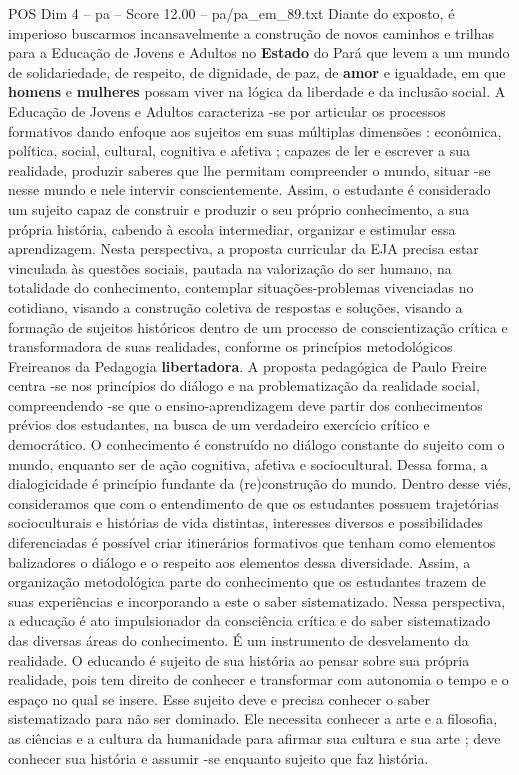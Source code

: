\begin{textsample}{POS Dim 4 – pa – Score 12.00 – pa/pa\_em\_89.txt}
Diante do exposto, é imperioso buscarmos incansavelmente a construção de novos caminhos e trilhas para a Educação de Jovens e Adultos no \textbf{Estado} do Pará que levem a um mundo de solidariedade, de respeito, de dignidade, de paz, de \textbf{amor} e igualdade, em que \textbf{homens} e \textbf{mulheres} possam viver na lógica da liberdade e da inclusão social.
A Educação de Jovens e Adultos caracteriza -se por articular os processos formativos dando enfoque aos sujeitos em suas múltiplas dimensões : econômica, política, social, cultural, cognitiva e afetiva ; capazes de ler e escrever a sua realidade, produzir saberes que lhe permitam compreender o mundo, situar -se nesse mundo e nele intervir conscientemente.
Assim, o estudante é considerado um sujeito capaz de construir e produzir o seu próprio conhecimento, a sua própria história, cabendo à escola intermediar, organizar e estimular essa aprendizagem.
Nesta perspectiva, a proposta curricular da EJA precisa estar vinculada às questões sociais, pautada na valorização do ser humano, na totalidade do conhecimento, contemplar situações-problemas vivenciadas no cotidiano, visando a construção coletiva de respostas e soluções, visando a formação de sujeitos históricos dentro de um processo de conscientização crítica e transformadora de suas realidades, conforme os princípios metodológicos Freireanos da Pedagogia \textbf{libertadora}.
A proposta pedagógica de Paulo Freire centra -se nos princípios do diálogo e na problematização da realidade social, compreendendo -se que o ensino-aprendizagem deve partir dos conhecimentos prévios dos estudantes, na busca de um verdadeiro exercício crítico e democrático.
O conhecimento é construído no diálogo constante do sujeito com o mundo, enquanto ser de ação cognitiva, afetiva e sociocultural.
Dessa forma, a dialogicidade é princípio fundante da (re)construção do mundo.
Dentro desse viés, consideramos que com o entendimento de que os estudantes possuem trajetórias socioculturais e histórias de vida distintas, interesses diversos e possibilidades diferenciadas é possível criar itinerários formativos que tenham como elementos balizadores o diálogo e o respeito aos elementos dessa diversidade.
Assim, a organização metodológica parte do conhecimento que os estudantes trazem de suas experiências e incorporando a este o saber sistematizado.
Nessa perspectiva, a educação é ato impulsionador da consciência crítica e do saber sistematizado das diversas áreas do conhecimento.
É um instrumento de desvelamento da realidade.
O educando é sujeito de sua história ao pensar sobre sua própria realidade, pois tem direito de conhecer e transformar com autonomia o tempo e o espaço no qual se insere.
Esse sujeito deve e precisa conhecer o saber sistematizado para não ser dominado.
Ele necessita conhecer a arte e a filosofia, as ciências e a cultura da humanidade para afirmar sua cultura e sua arte ; deve conhecer sua história e assumir -se enquanto sujeito que faz história.

\end{textsample}
